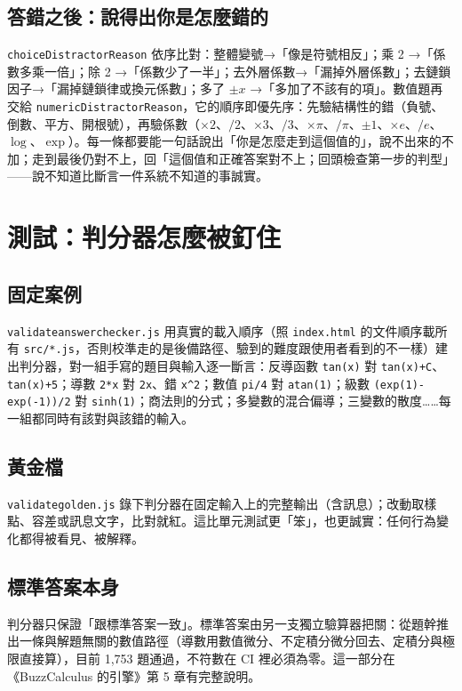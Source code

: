 \documentclass[11pt,a4paper,oneside]{book}
\renewcommand{\_}{\ifmmode\origunderscore\else\textunderscore\allowbreak\fi}
\newcommand{\code}[1]{\texttt{#1}}
\newcommand{\file}[1]{\texttt{\small #1}}
\begin{document}
\section{答錯之後：說得出你是怎麼錯的}
\code{choiceDistractorReason} 依序比對：整體變號→「像是符號相反」；乘 2 →「係數多乘一倍」；除 2 →「係數少了一半」；去外層係數→「漏掉外層係數」；去鏈鎖因子→「漏掉鏈鎖律或換元係數」；多了 $\pm x$ →「多加了不該有的項」。數值題再交給 \code{numericDistractorReason}，它的順序即優先序：先驗結構性的錯（負號、倒數、平方、開根號），再驗係數（$\times 2$、$/2$、$\times 3$、$/3$、$\times\pi$、$/\pi$、$\pm 1$、$\times e$、$/e$、$\log$、$\exp$）。每一條都要能一句話說出「你是怎麼走到這個值的」，說不出來的不加；走到最後仍對不上，回「這個值和正確答案對不上；回頭檢查第一步的判型」——說不知道比斷言一件系統不知道的事誠實。

\chapter{測試：判分器怎麼被釘住}
\section{固定案例}
\file{validate\_answer\_checker.js} 用真實的載入順序（照 \file{index.html} 的文件順序載所有 \file{src/*.js}，否則校準走的是後備路徑、驗到的難度跟使用者看到的不一樣）建出判分器，對一組手寫的題目與輸入逐一斷言：反導函數 \code{tan(x)} 對 \code{tan(x)+C}、\code{tan(x)+5}；導數 \code{2*x} 對 \code{2x}、錯 \code{x\string^2}；數值 \code{pi/4} 對 \code{atan(1)}；級數 \code{(exp(1)-exp(-1))/2} 對 \code{sinh(1)}；商法則的分式；多變數的混合偏導；三變數的散度……每一組都同時有該對與該錯的輸入。

\section{黃金檔}
\file{validate\_golden.js} 錄下判分器在固定輸入上的完整輸出（含訊息）；改動取樣點、容差或訊息文字，比對就紅。這比單元測試更「笨」，也更誠實：任何行為變化都得被看見、被解釋。

\section{標準答案本身}
判分器只保證「跟標準答案一致」。標準答案由另一支獨立驗算器把關：從題幹推出一條與解題無關的數值路徑（導數用數值微分、不定積分微分回去、定積分與極限直接算），目前 1,753 題通過，不符數在 CI 裡必須為零。這一部分在《BuzzCalculus 的引擎》第 5 章有完整說明。
\end{document}
